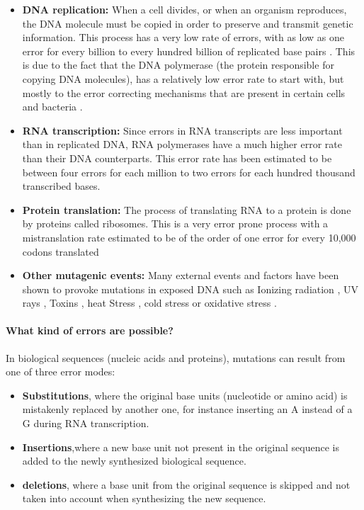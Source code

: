 \documentclass[
  11pt,
  twoside,
  BCOR=10mm,
  listof=totoc]{scrbook}
\providecommand{\tightlist}{%
  \setlength{\itemsep}{0pt}\setlength{\parskip}{0pt}}
\begin{document}
\begin{itemize}
\item
  \textbf{DNA replication:} When a cell divides, or when an organism reproduces, the DNA molecule must be copied in order to preserve and transmit genetic information. This process has a very low rate of errors, with as low as one error for every billion to every hundred billion of replicated base pairs \autocite{fijalkowska2012}. This is due to the fact that the DNA polymerase (the protein responsible for copying DNA molecules), has a relatively low error rate to start with, but mostly to the error correcting mechanisms that are present in certain cells and bacteria \autocite{pray2008dna}.
\item
  \textbf{RNA transcription:} Since errors in RNA transcripts are less important than in replicated DNA, RNA polymerases have a much higher error rate than their DNA counterparts. This error rate has been estimated to be between four errors for each million \autocite{gout2013} to two errors for each hundred thousand \autocite{gout2017} transcribed bases.
\item
  \textbf{Protein translation:} The process of translating RNA to a protein is done by proteins called ribosomes. This is a very error prone process with a mistranslation rate estimated to be of the order of one error for every 10,000 codons translated \autocite{shcherbakovRibosomalMistranslationLeads2019}
\item
  \textbf{Other mutagenic events:} Many external events and factors have been shown to provoke mutations in exposed DNA such as Ionizing radiation \autocite{desouky2015}, UV rays \autocite{kiefer2007}, Toxins \autocite{bennett2003}, heat Stress \autocite{kantidze2016}, cold stress \autocite{gregory1994} or oxidative stress \autocite{gafter-gvili2013}.
\end{itemize}

\hypertarget{what-kind-of-errors-are-possible}{%
\paragraph{What kind of errors are possible?}\label{what-kind-of-errors-are-possible}}

In biological sequences (nucleic acids and proteins), mutations can result from one of three error modes:

\begin{itemize}
\tightlist
\item
  \textbf{Substitutions}, where the original base units (nucleotide or amino acid) is mistakenly replaced by another one, for instance inserting an A instead of a G during RNA transcription.
\item
  \textbf{Insertions},where a new base unit not present in the original sequence is added to the newly synthesized biological sequence.
\item
  \textbf{deletions}, where a base unit from the original sequence is skipped and not taken into account when synthesizing the new sequence.
\end{itemize}
\end{document}
